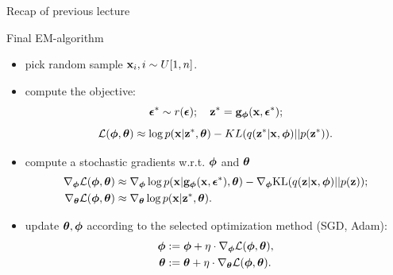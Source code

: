 \begin{frame}{Recap of previous lecture}
	\begin{block}{Final EM-algorithm}
		\begin{itemize}
			\item pick random sample $\mathbf{x}_i, i \sim U[1, n]$.
			\item compute the objective:
			\vspace{-0.3cm}
			\[
			\boldsymbol{\epsilon}^* \sim r(\boldsymbol{\epsilon}); \quad \mathbf{z}^* = \mathbf{g}_{\boldsymbol{\phi}}(\mathbf{x}, \boldsymbol{\epsilon}^*);
			\]
			\[
			\mathcal{L}(\boldsymbol{\phi}, \boldsymbol{\theta}) \approx  \log p(\mathbf{x} | \mathbf{z}^*, \boldsymbol{\theta}) - KL(q(\mathbf{z}^* | \mathbf{x}, \boldsymbol{\phi}) || p(\mathbf{z}^*)).
			\]
			\item compute a stochastic gradients w.r.t. $\boldsymbol{\phi}$ and $\boldsymbol{\theta}$
			\begin{align*}
				\nabla_{\boldsymbol{\phi}} \mathcal{L} (\boldsymbol{\phi}, \boldsymbol{\theta}) &\approx \nabla_{\boldsymbol{\phi}} \log p(\mathbf{x} | \mathbf{g}_{\boldsymbol{\phi}}(\mathbf{x}, \boldsymbol{\epsilon}^*), \boldsymbol{\theta})  - \nabla_{\boldsymbol{\phi}} \text{KL}(q(\mathbf{z} | \mathbf{x}, \boldsymbol{\phi}) || p(\mathbf{z})); \\
				\nabla_{\boldsymbol{\theta}} \mathcal{L} (\boldsymbol{\phi}, \boldsymbol{\theta}) &\approx \nabla_{\boldsymbol{\theta}} \log p(\mathbf{x}|\mathbf{z}^*, \boldsymbol{\theta}).
			\end{align*}
			\item update $\boldsymbol{\theta}, \boldsymbol{\phi}$ according to the selected optimization method (SGD, Adam):
			\begin{align*}
				\boldsymbol{\phi} &:= \boldsymbol{\phi} + \eta \cdot \nabla_{\boldsymbol{\phi}} \mathcal{L}(\boldsymbol{\phi}, \boldsymbol{\theta}), \\
				\boldsymbol{\theta} &:= \boldsymbol{\theta} + \eta \cdot \nabla_{\boldsymbol{\theta}} \mathcal{L}(\boldsymbol{\phi}, \boldsymbol{\theta}).
			\end{align*}
		\end{itemize}
	\end{block}
\end{frame}
